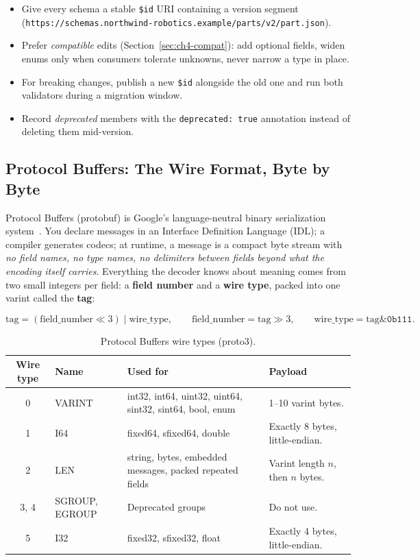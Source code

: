 \begin{itemize}
  \item Give every schema a stable \texttt{\$id} URI containing a version segment
        (\texttt{https://schemas.northwind-robotics.example/parts/v2/part.json}).
  \item Prefer \emph{compatible} edits (Section~\ref{sec:ch4-compat}): add optional
        fields, widen enums only when consumers tolerate unknowns, never narrow a
        type in place.
  \item For breaking changes, publish a new \texttt{\$id} alongside the old one and
        run both validators during a migration window.
  \item Record \emph{deprecated} members with the \texttt{deprecated: true}
        annotation instead of deleting them mid-version.
\end{itemize}

\subsection{Protocol Buffers: The Wire Format, Byte by Byte}
\label{sec:ch4-protobuf}

Protocol Buffers (protobuf) is Google's language-neutral binary serialization
system~\cite{protobufdocs}. You declare messages in an Interface Definition Language
(IDL); a compiler generates codecs; at runtime, a message is a compact byte stream
with \emph{no field names, no type names, no delimiters between fields beyond what
the encoding itself carries}. Everything the decoder knows about meaning comes from
two small integers per field: a \textbf{field number} and a \textbf{wire type},
packed into one varint called the \textbf{tag}:

\[
\text{tag} = (\text{field\_number} \ll 3) \mathbin{|} \text{wire\_type},
\qquad
\text{field\_number} = \text{tag} \gg 3,
\qquad
\text{wire\_type} = \text{tag} \mathbin{\&} \texttt{0b111}.
\]

\begin{table}[h]
  \centering
  \small
  \begin{tabularx}{\textwidth}{c l l X}
    \toprule
    \textbf{Wire type} & \textbf{Name} & \textbf{Used for} & \textbf{Payload} \\
    \midrule
    0 & VARINT & int32, int64, uint32, uint64, sint32, sint64, bool, enum & 1--10 varint bytes. \\
    1 & I64 & fixed64, sfixed64, double & Exactly 8 bytes, little-endian. \\
    2 & LEN & string, bytes, embedded messages, packed repeated fields & Varint length $n$, then $n$ bytes. \\
    3, 4 & SGROUP, EGROUP & Deprecated groups & Do not use. \\
    5 & I32 & fixed32, sfixed32, float & Exactly 4 bytes, little-endian. \\
    \bottomrule
  \end{tabularx}
  \caption{Protocol Buffers wire types (proto3).}
  \label{tab:ch4-wiretypes}
\end{table}


